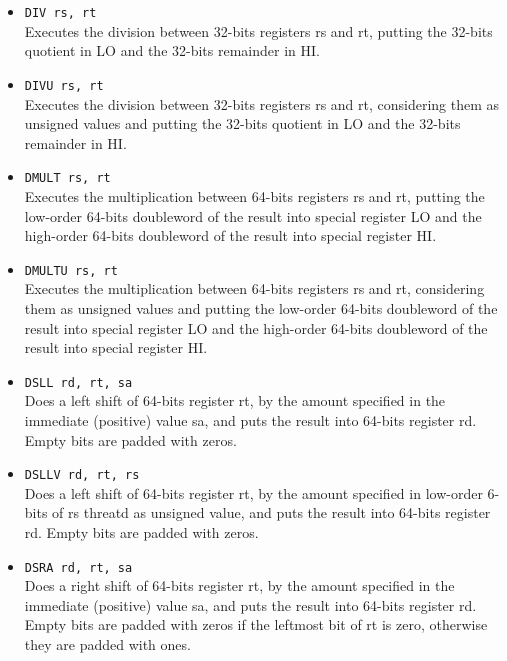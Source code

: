 \documentclass[12pt]{report}
\begin{document}
\begin{itemize}
	\item \texttt{DIV rs, rt}\\
	Executes the division between 32-bits registers rs and rt, putting the 32-bits quotient in LO and the
	32-bits remainder in HI.

	\item \texttt{DIVU rs, rt}\\
	Executes the division between 32-bits registers rs and rt, considering them as unsigned values
    	and putting the 32-bits quotient in LO and the 32-bits remainder in HI.

	\item \texttt{DMULT rs, rt}\\
	Executes the multiplication between 64-bits registers rs and rt, putting the low-order 64-bits doubleword
	of the result into special register LO and the high-order 64-bits doubleword of the result into special
	register HI.

	\item \texttt{DMULTU rs, rt}\\
	Executes the multiplication between 64-bits registers rs and rt, considering them as unsigned
  	values and putting the low-order 64-bits doubleword of the result into special register LO 
	and the high-order 64-bits doubleword of the result into special register HI.
	
	\item \texttt{DSLL rd, rt, sa}\\
	Does a left shift of 64-bits register rt, by the amount specified in the
	immediate (positive) value sa, and puts the result into 64-bits register rd. Empty bits are padded with
	zeros.

	\item \texttt{DSLLV rd, rt, rs}\\
	Does a left shift of 64-bits register rt, by the amount specified in low-order 6-bits of rs threatd as unsigned value,
	and puts the result into 64-bits register rd. Empty bits are padded with zeros.

	\item \texttt{DSRA rd, rt, sa}\\
	Does a right shift of 64-bits register rt, by the amount specified in the immediate (positive) value sa,
	and puts the result into 64-bits register rd. Empty bits are padded with zeros if the leftmost bit
	of rt is zero, otherwise they are padded with ones.


\end{itemize}
\end{document}
